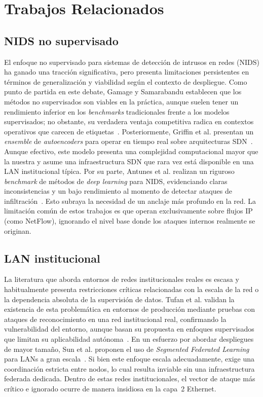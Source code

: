 \documentclass[conference]{IEEEtran}
\begin{document}
\section{Trabajos Relacionados}
 
\subsection{NIDS no supervisado}
El enfoque no supervisado para sistemas de detección de intrusos en redes
(NIDS) ha ganado una tracción significativa, pero presenta limitaciones
persistentes en términos de generalización y viabilidad según el contexto
de despliegue. Como punto de partida en este debate, Gamage y Samarabandu
establecen que los métodos no supervisados son viables en la práctica,
aunque suelen tener un rendimiento inferior en los \textit{benchmarks}
tradicionales frente a los modelos supervisados; no obstante, su
verdadera ventaja competitiva radica en contextos operativos que carecen
de etiquetas~\cite{gamage2020}. Posteriormente, Griffin et al. presentan
un \textit{ensemble} de \textit{autoencoders} para operar en tiempo real
sobre arquitecturas SDN~\cite{griffinyang2022}. Aunque efectivo, este
modelo presenta una complejidad computacional mayor que la nuestra y
asume una infraestructura SDN que rara vez está disponible en una LAN
institucional típica. Por su parte, Antunes et al. realizan un riguroso
\textit{benchmark} de métodos de \textit{deep learning} para NIDS,
evidenciando claras inconsistencias y un bajo rendimiento al momento de
detectar ataques de infiltración~\cite{antunes2022}. Esto subraya la
necesidad de un anclaje más profundo en la red. La limitación común de
estos trabajos es que operan exclusivamente sobre flujos IP (como
NetFlow), ignorando el nivel base donde los ataques internos realmente
se originan.
 
\subsection{LAN institucional}
La literatura que aborda entornos de redes institucionales reales es
escasa y habitualmente presenta restricciones críticas relacionadas con
la escala de la red o la dependencia absoluta de la supervisión de datos.
Tufan et al. validan la existencia de esta problemática en entornos de
producción mediante pruebas con ataques de reconocimiento en una red
institucional real, confirmando la vulnerabilidad del entorno, aunque
basan su propuesta en enfoques supervisados que limitan su aplicabilidad
autónoma~\cite{tufan2021}. En un esfuerzo por abordar despliegues de
mayor tamaño, Sun et al. proponen el uso de \textit{Segmented Federated
Learning} para LANs a gran escala~\cite{sun2021ojcoms}. Si bien este
enfoque escala adecuadamente, exige una coordinación estricta entre
nodos, lo cual resulta inviable sin una infraestructura federada
dedicada. Dentro de estas redes institucionales, el vector de ataque más
crítico e ignorado ocurre de manera insidiosa en la capa~2 Ethernet.
 
\end{document}
